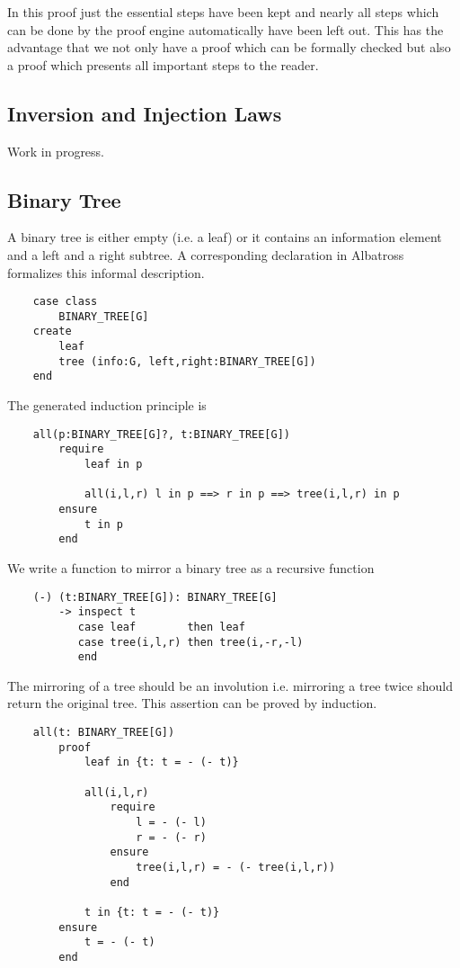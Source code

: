 In this proof just the essential steps have been kept and nearly all steps
which can be done by the proof engine automatically have been left out. This
has the advantage that we not only have a proof which can be formally checked
but also a proof which presents all important steps to the reader.

\subsection{Inversion and Injection Laws}

Work in progress.

\subsection{Binary Tree}

A binary tree is either empty (i.e. a leaf) or it contains an
information element and a left and a right subtree. A corresponding
declaration in Albatross formalizes this informal description.


\begin{lstlisting}
    case class
        BINARY_TREE[G]
    create
        leaf
        tree (info:G, left,right:BINARY_TREE[G])
    end
\end{lstlisting}

The generated induction principle is

\begin{lstlisting}
    all(p:BINARY_TREE[G]?, t:BINARY_TREE[G])
        require
            leaf in p

            all(i,l,r) l in p ==> r in p ==> tree(i,l,r) in p
        ensure
            t in p
        end
\end{lstlisting}

We write a function to mirror a binary tree as a recursive function

\begin{lstlisting}
    (-) (t:BINARY_TREE[G]): BINARY_TREE[G]
        -> inspect t
           case leaf        then leaf
           case tree(i,l,r) then tree(i,-r,-l)
           end
\end{lstlisting}

The mirroring of a tree should be an involution i.e. mirroring a tree twice
should return the original tree. This assertion can be proved by induction.

\begin{lstlisting}
    all(t: BINARY_TREE[G])
        proof
            leaf in {t: t = - (- t)}

            all(i,l,r)
                require
                    l = - (- l)
                    r = - (- r)
                ensure
                    tree(i,l,r) = - (- tree(i,l,r))
                end

            t in {t: t = - (- t)}
        ensure
            t = - (- t)
        end
\end{lstlisting}

